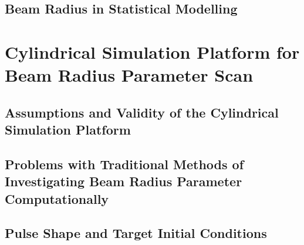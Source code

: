 \subsection{Beam Radius in Statistical Modelling}%
\label{sec:Res1_OMEGA_stat_modelling_RbRt}


\section{Cylindrical Simulation Platform for Beam Radius Parameter Scan}%
\label{sec:Res1_CylRbRt_platform}


\subsection{Assumptions and Validity of the Cylindrical Simulation Platform}%
\label{sec:Res1_platformvalidity}


\subsection{Problems with Traditional Methods of Investigating Beam Radius Parameter Computationally}%
\label{sec:Res1_computational_difficulties}


\subsection{Pulse Shape and Target Initial Conditions}%
\label{sec:Res1_initialconditions}

